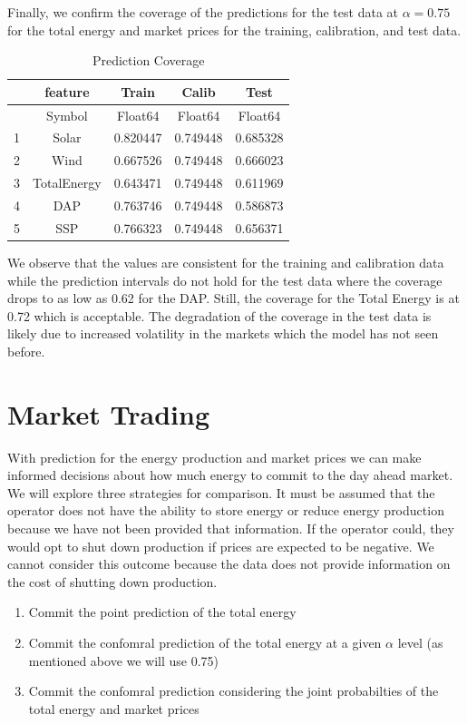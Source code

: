 \documentclass[
  journal,
]{IEEEtran}%
\providecommand{\tightlist}{%
  \setlength{\itemsep}{0pt}\setlength{\parskip}{0pt}}\usepackage{longtable,booktabs,array}
\begin{document}
Finally, we confirm the coverage of the predictions for the test data at
\(\alpha=0.75\) for the total energy and market prices for the training,
calibration, and test data.

\label{coverage-table}
\begin{table}
\caption{Prediction Coverage}\tabularnewline

\centering
\begin{tabular}{r|cccc}
    & feature & Train & Calib & Test\\
    \hline
    & Symbol & Float64 & Float64 & Float64\\
    \hline
    1 & Solar & 0.820447 & 0.749448 & 0.685328 \\
    2 & Wind & 0.667526 & 0.749448 & 0.666023 \\
    3 & TotalEnergy & 0.643471 & 0.749448 & 0.611969 \\
    4 & DAP & 0.763746 & 0.749448 & 0.586873 \\
    5 & SSP & 0.766323 & 0.749448 & 0.656371 \\
\end{tabular}
\end{table}

We observe that the values are consistent for the training and
calibration data while the prediction intervals do not hold for the test
data where the coverage drops to as low as 0.62 for the DAP. Still, the
coverage for the Total Energy is at 0.72 which is acceptable. The
degradation of the coverage in the test data is likely due to increased
volatility in the markets which the model has not seen before.

\section{Market Trading}\label{market-trading}

With prediction for the energy production and market prices we can make
informed decisions about how much energy to commit to the day ahead
market. We will explore three strategies for comparison. It must be
assumed that the operator does not have the ability to store energy or
reduce energy production because we have not been provided that
information. If the operator could, they would opt to shut down
production if prices are expected to be negative. We cannot consider
this outcome because the data does not provide information on the cost
of shutting down production.

\begin{enumerate}
\def\labelenumi{\arabic{enumi}.}
\tightlist
\item
  Commit the point prediction of the total energy
\item
  Commit the confomral prediction of the total energy at a given
  \(\alpha\) level (as mentioned above we will use 0.75)
\item
  Commit the confomral prediction considering the joint probabilties of
  the total energy and market prices
\end{enumerate}
\end{document}
